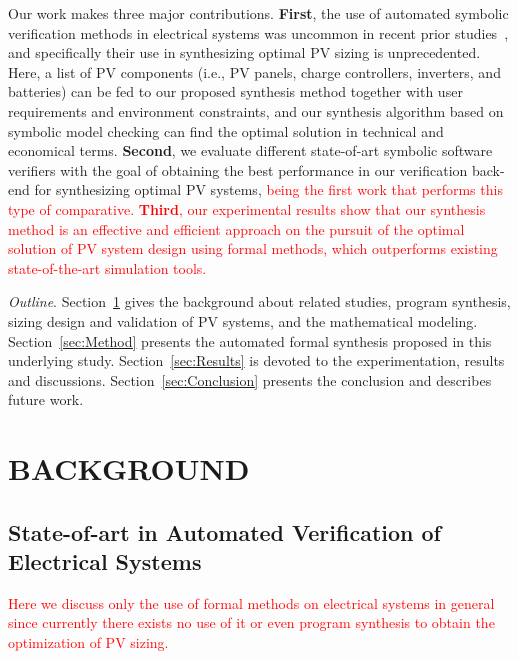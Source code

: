 \documentclass[review]{elsarticle}
\begin{document}
Our work makes three major contributions. \textbf{First}, the use of automated 
symbolic verification methods in electrical systems was uncommon in recent 
prior studies~\cite{abs-1811-09438}, and specifically their use in synthesizing 
optimal PV sizing is unprecedented. Here, a list of PV components (i.e., PV panels, 
charge controllers, inverters, and batteries) can be fed to our proposed synthesis 
method together with user requirements and environment constraints, 
and our synthesis algorithm based on symbolic model checking 
can find the optimal solution in technical and economical terms. 
\textbf{Second}, we evaluate different state-of-art symbolic software 
verifiers with the goal of obtaining the best performance in our verification 
back-end for synthesizing optimal PV systems, \textcolor{red}{being the first work that performs this type of comparative.}
\textcolor{red}{\textbf{Third}, our experimental results show that our synthesis method is an effective and efficient approach 
on the pursuit of the optimal solution of PV system design using formal methods, which outperforms 
existing state-of-the-art simulation tools.}

\noindent \textit{Outline}. Section~\ref{sec:Background} gives the background about related studies, 
program synthesis, sizing design and validation of PV systems, and the mathematical modeling. 
Section~\ref{sec:Method} presents the automated formal synthesis proposed 
in this underlying study. Section~\ref{sec:Results} is devoted to the experimentation, 
results and discussions. Section~\ref{sec:Conclusion} presents the conclusion and describes future work.
%
\section{BACKGROUND}
\label{sec:Background}

\subsection{State-of-art in Automated Verification of Electrical Systems}

\textcolor{red} {Here we discuss only the use of formal methods on electrical systems in general since currently there exists no use of it or even program synthesis to obtain the optimization of PV sizing.}
\end{document}

